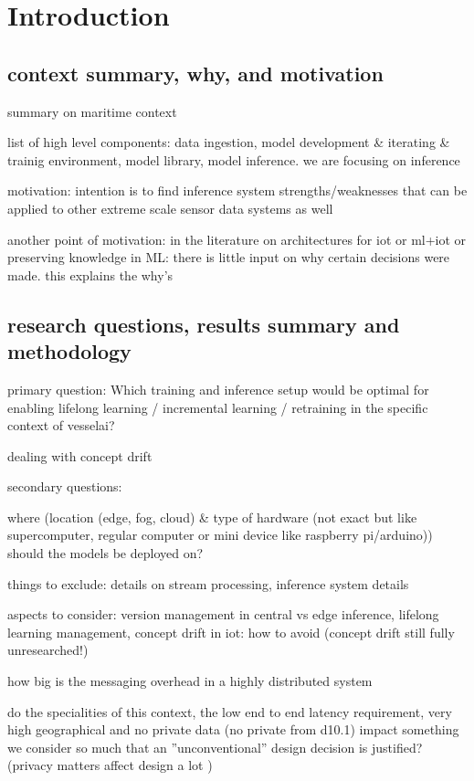\chapter{Introduction}

\section{context summary, why, and motivation}
summary on maritime context

list of high level components: data ingestion, model development & iterating & trainig environment, model library, model inference. we are focusing on inference

motivation: intention is to find inference system strengths/weaknesses that can be applied to other extreme scale sensor data systems as well

another point of motivation: in the literature on architectures for iot or ml+iot or preserving knowledge in ML: there is little input on why certain decisions were made. this explains the why's

\section{research questions, results summary and methodology}

primary question: Which training and inference setup would be optimal for enabling lifelong learning / incremental learning / retraining in the specific context of vesselai?

dealing with concept drift

secondary questions:

where (location (edge, fog, cloud) & type of hardware (not exact but like supercomputer, regular computer or mini device like raspberry pi/arduino)) should the models be deployed on?

things to exclude: details on stream processing, inference system details

aspects to consider: version management in central vs edge inference, lifelong learning management, concept drift in iot: how to avoid (concept drift still fully unresearched!)

how big is the messaging overhead in a highly distributed system

do the specialities of this context, the low end to end latency requirement, very high geographical and no private data (no private from d10.1) impact something we consider so much that an ''unconventional'' design decision is justified? (privacy matters affect design a lot \cite{iotsystems})


